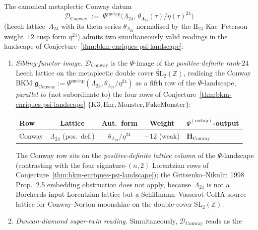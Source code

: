 \begin{theorem}
\label{thm:bkm-enriques-conway-dual-reading}
The canonical metaplectic Conway datum
\[
 \mathcal{D}_{\mathrm{Conway}}
 \;:=\;
 \Psi^{\mathrm{metap}}\!\bigl(\Lambda_{24},\,
 \theta_{\Lambda_{24}}(\tau)/\eta(\tau)^{24}\bigr)
\]
(Leech lattice~$\Lambda_{24}$ with its theta-series
$\theta_{\Lambda_{24}}$ normalised by the
$\mathrm{II}_{24}$-Kac--Peterson weight~$12$ cusp form $\eta^{24}$)
admits two simultaneously valid readings in the landscape of
Conjecture~\textup{\ref{thm:bkm-enriques-psi-landscape}}:
\begin{enumerate}
\item \emph{Sibling-functor image.}
$\mathcal{D}_{\mathrm{Conway}}$ is the $\Psi$-image of the
\emph{positive-definite rank-$24$} Leech lattice on the
metaplectic double cover $\widetilde{\mathrm{SL}}_2(\mathbb{Z})$,
realising the Conway BKM
$\mathfrak{g}_{\mathrm{Conway}} :=
\Psi^{\mathrm{metap}}(\Lambda_{24}, \theta_{\Lambda_{24}}/\eta^{24})$
as a fifth row of the $\Psi$-landscape,
\emph{parallel to} (not subordinate to) the four rows of
Conjecture~\textup{\ref{thm:bkm-enriques-psi-landscape}}
$\{\mathrm{K3},\mathrm{Enr},\mathrm{Monster},\mathrm{FakeMonster}\}$:
\begin{center}
\begin{tabular}{lcccl}
\toprule
Row & Lattice & Aut.~form & Weight & $\Psi^{(\mathrm{metap})}$-output \\
\midrule
Conway & $\Lambda_{24}$ (pos.~def.) &
 $\theta_{\Lambda_{24}}/\eta^{24}$ & $-12$ (weak) &
 $\mathbf{H}_{\mathrm{Conway}}$ \\
\bottomrule
\end{tabular}
\end{center}
The Conway row sits on the \emph{positive-definite lattice column}
of the $\Psi$-landscape (contrasting with the four signature-$(n,2)$
Lorentzian rows of
Conjecture~\textup{\ref{thm:bkm-enriques-psi-landscape}}); the
Gritsenko--Nikulin 1998 Prop.~2.5 embedding obstruction does not
apply, because~$\Lambda_{24}$ is not a Borcherds-input Lorentzian
lattice but a Schiffmann--Vasserot CoHA-source lattice for
Conway-Norton moonshine on the double-cover
$\widetilde{\mathrm{SL}}_2(\mathbb{Z})$.
\item \emph{Duncan-diamond super-twin reading.}
Simultaneously, $\mathcal{D}_{\mathrm{Conway}}$ reads as the

\end{enumerate}
\end{theorem}
